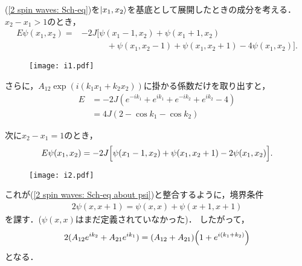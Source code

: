 \documentclass[\main/main.tex]{subfiles}
\begin{document}
\begin{frame}{}
    (\ref{2 spin waves: Sch-eq})を$\ket{x_1, x_2}$を基底として展開したときの成分を考える．$x_2 - x_1 > 1$のとき，
    \begin{align}
        E\psi(x_1, x_2) = &
        -2J\Big[
            \psi(x_1-1, x_2) + \psi(x_1+1, x_2) \nonumber
        \\ & \qquad\quad
        + \psi(x_1, x_2-1) + \psi(x_1, x_2+1) - 4\psi(x_1, x_2)\Big].
        \label{2 spin waves: Sch-eq about psi}
    \end{align}
    \begin{figure}[H]
        \centering
        \texttt{[image: i1.pdf]}
    \end{figure}
    さらに，$A_{12}\exp(i(k_1 x_1 + k_2 x_2))$に掛かる係数だけを取り出すと，
    \begin{align}
        E
        &\nonumber
        = -2J(e^{-ik_1} + e^{ik_1} + e^{-ik_2} + e^{ik_2} - 4)
        \\ &
        = 4J(2-\cos{k_1}-\cos{k_2})
    \end{align}

\end{frame}

\begin{frame}{}
    次に$x_2 - x_1 = 1$のとき，
    \begin{align}
        E\psi(x_1, x_2) = -2J \qty\Big[\psi(x_1-1,x_2) + \psi(x_1,x_2+1) - 2\psi(x_1,x_2)].
    \end{align}
    \begin{figure}[H]
        \centering
        \texttt{[image: i2.pdf]}
    \end{figure}
    これが(\ref{2 spin waves: Sch-eq about psi})と整合するように，境界条件
    \begin{align}
        2\psi(x, x+1) = \psi(x, x) + \psi(x+1,x+1)
    \end{align}
    を課す．($\psi(x,x)$はまだ定義されていなかった)．
    したがって，
    \begin{gather}
        2(A_{12}e^{ik_2} + A_{21}e^{ik_1})
        = (A_{12}+A_{21})\qty(1+e^{i(k_1+k_2)})
        \label{2 spin waves: connection condition}
    \end{gather}
    となる．
\end{frame}
\end{document}
